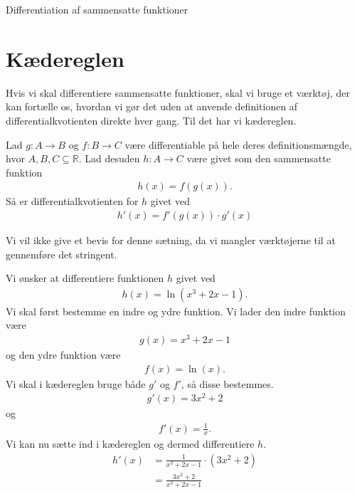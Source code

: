 \begin{center}
\Huge
Differentiation af sammensatte funktioner
\end{center}
\section*{Kædereglen}

Hvis vi skal differentiere sammensatte funktioner, skal vi bruge et værktøj, der kan fortælle os, hvordan vi gør det uden at anvende definitionen af differentialkvotienten direkte hver gang. Til det har vi kædereglen.
\begin{setn}[Kædereglen]
Lad $g:A \to B$ og $f:B \to C$ være differentiable på hele deres definitionsmængde, 
hvor $A,B,C \subseteq \mathbb{R}$. Lad desuden $h: A \to C$ være givet som den sammensatte funktion
\begin{align*}
	h(x) = f(g(x)).
\end{align*}
Så er differentialkvotienten for $h$ givet ved
\begin{align*}
	h'(x) = f'(g(x))\cdot g'(x) 
\end{align*}
\end{setn}
Vi vil ikke give et bevis for denne sætning, da vi mangler værktøjerne til at gennemføre det stringent.
\begin{exa}
Vi ønsker at differentiere funktionen $h$ givet ved
\begin{align*}
	h(x) = \ln(x^3+2x-1).
\end{align*}
Vi skal først bestemme en indre og ydre funktion. Vi lader den indre funktion være 
\begin{align*}
	g(x) = x^3+2x-1
\end{align*}
og den ydre funktion være 
\begin{align*}
	f(x) = \ln(x).
\end{align*}
Vi skal i kædereglen bruge både $g'$ og $f'$, så disse bestemmes.
\begin{align*}
	g'(x) = 3x^2 + 2
\end{align*}
og
\begin{align*}
	f'(x) = \frac{1}{x}.
\end{align*}
Vi kan nu sætte ind i kædereglen og dermed differentiere $h$.
\begin{align*}
	h'(x) &= \frac{1}{x^3 + 2x - 1}\cdot (3x^2 + 2)\\
	&=\frac{3x^2+2}{x^3 + 2x - 1}
\end{align*}
\end{exa}

